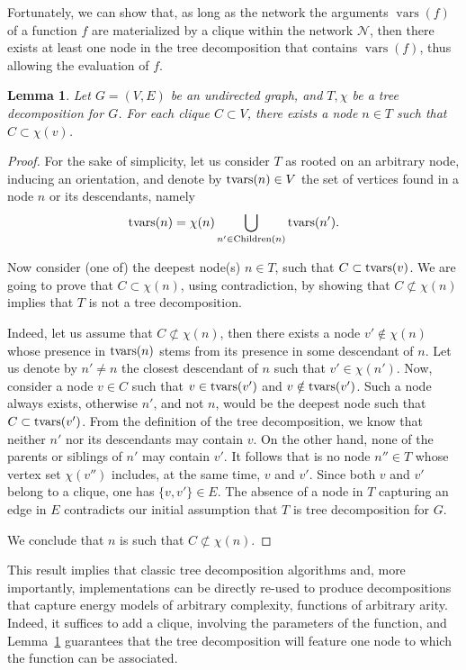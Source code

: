 \documentclass{bioinfo}
\newtheorem{lemma}[theorem]{Lemma}
\newcommand{\network}{\mathcal{N}}
\newcommand{\vars}{\operatorname{vars}}
\begin{document}
Fortunately, we can show that, as long as the network the arguments $\vars(f)$ of a function $f$ are materialized by a clique within the network $\network$, then there exists at least one node in the tree decomposition that contains $\vars(f)$, thus allowing the evaluation of $f$.
\begin{lemma}\label{lem:cliques}
Let $G=(V,E)$ be an undirected graph, and  $T,\chi$ be a tree decomposition for $G$. For each clique $C\subset V$, there exists a node $n\in T$ such that $C\subset\chi(v)$.
\end{lemma}
\begin{proof}
  \newcommand{\TransVars}[1]{{\rm tvars}(#1)}
  \newcommand{\Children}[1]{{\rm Children}(#1)}
  For the sake of simplicity, let us consider $T$ as rooted on an arbitrary node, inducing an orientation, and denote by $\TransVars{n}\in V$ the set of vertices found in a node $n$ or its descendants, namely
    $$\TransVars{n} = \chi(n) \bigcup_{n'\in\Children{n}} \TransVars{n'}.$$ 
  
  Now consider (one of) the deepest node(s) $n\in T$, such that $C\subset\TransVars{v}$. We are going to prove that $C\subset\chi(n)$, using contradiction, by showing that $C\not\subset\chi(n)$ implies that $T$ is not a tree decomposition. 
  
  Indeed, let us assume that $C\not\subset\chi(n)$, then there exists a node $v'\notin\chi(n)$ whose presence in $\TransVars{n}$ stems from its presence in some descendant of $n$. Let us denote by $n'\neq n$ the closest descendant of $n$ such that $v'\in\chi(n')$. Now, consider a node $v\in C$ such that $v\in \TransVars{v'}$ and $v\notin \TransVars{v'}$. Such a node always exists, otherwise $n'$, and not $n$, would be the deepest node such that $C\subset \TransVars{v'}$. From the definition of the tree decomposition, we know that neither $n'$ nor its descendants may contain $v$. On the other hand, none of the parents or siblings of $n'$ may contain $v'$. It follows that is no node $n''\in T$ whose vertex set $\chi(v'')$ includes, at the same time, $v$ and $v'$. Since both $v$ and $v'$ belong to a clique, one has $\{v,v'\}\in E$. The absence of a node in $T$ capturing an edge in $E$ contradicts our initial assumption that $T$ is tree decomposition for $G$.
  
  We conclude that $n$ is such that $C\not\subset\chi(n)$.
\end{proof}

This result implies that classic tree decomposition algorithms and, more importantly, implementations can be directly re-used to produce decompositions that capture energy models of arbitrary complexity, functions of arbitrary arity. Indeed, it suffices to add a clique, involving the parameters of the function, and Lemma~\ref{lem:cliques} guarantees that the tree decomposition will feature one node to which the function can be associated.
\end{document}
